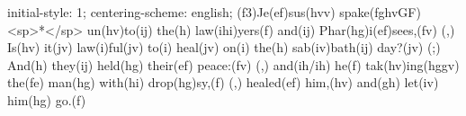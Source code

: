 initial-style: 1;
centering-scheme: english;
(f3)Je(ef)sus(hvv) spake(fghvGF) <sp>*</sp> un(hv)to(ij) the(h) law(ihi)yers(f) and(ij) Phar(hg)i(ef)sees,(fv) (,) Is(hv) it(jv) law(i)ful(jv) to(i) heal(jv) on(i) the(h) sab(iv)bath(ij) day?(jv) (;) And(h) they(ij) held(hg) their(ef) peace:(fv) (,) and(ih/ih) he(f) tak(hv)ing(hggv) the(fe) man(hg) with(hi) drop(hg)sy,(f) (,) healed(ef) him,(hv) and(gh) let(iv) him(hg) go.(f)
